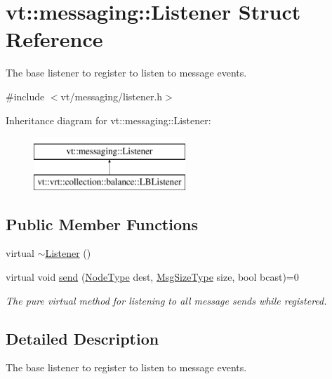 \hypertarget{structvt_1_1messaging_1_1_listener}{}\section{vt\+:\+:messaging\+:\+:Listener Struct Reference}
\label{structvt_1_1messaging_1_1_listener}


The base listener to register to listen to message events.  




{\ttfamily \#include $<$vt/messaging/listener.\+h$>$}

Inheritance diagram for vt\+:\+:messaging\+:\+:Listener\+:\begin{figure}[H]
\begin{center}
\leavevmode
\includegraphics[height=2.000000cm]{structvt_1_1messaging_1_1_listener}
\end{center}
\end{figure}
\subsection*{Public Member Functions}
\begin{DoxyCompactItemize}
\item 
virtual \hyperlink{structvt_1_1messaging_1_1_listener_aee8a1131c7427cb1f8e2005605f2718c}{$\sim$\+Listener} ()
\item 
virtual void \hyperlink{structvt_1_1messaging_1_1_listener_ab2b334277feecb181a28f613c68bfc53}{send} (\hyperlink{namespacevt_a866da9d0efc19c0a1ce79e9e492f47e2}{Node\+Type} dest, \hyperlink{namespacevt_abfa009d900299ac1df967b40ea8f2c8a}{Msg\+Size\+Type} size, bool bcast)=0
\begin{DoxyCompactList}\small\item\em The pure virtual method for listening to all message sends while registered. \end{DoxyCompactList}\end{DoxyCompactItemize}


\subsection{Detailed Description}
The base listener to register to listen to message events. 

